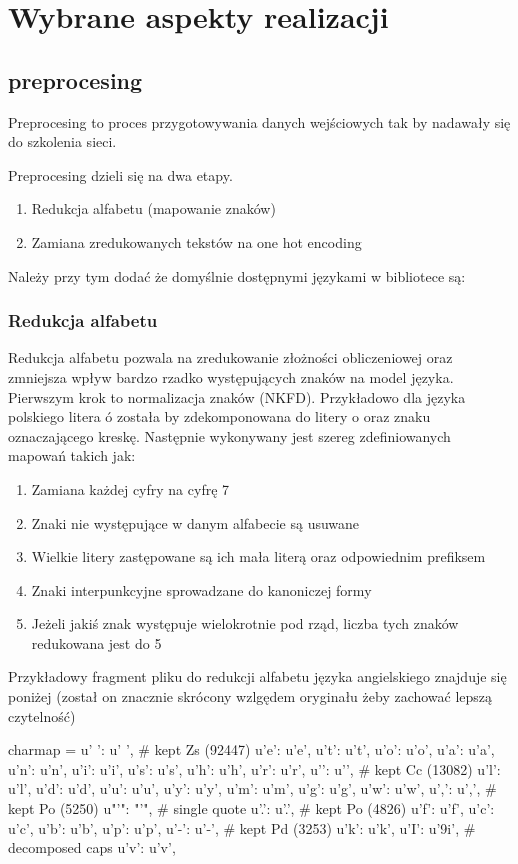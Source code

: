 \newpage
\section{Wybrane aspekty realizacji}

\subsection{preprocesing}
Preprocesing to proces przygotowywania danych wejściowych tak by nadawały się do szkolenia sieci.

Preprocesing dzieli się na dwa etapy.
\begin{enumerate}
	\item Redukcja alfabetu (mapowanie znaków)
	\item Zamiana zredukowanych tekstów na one hot encoding
\end{enumerate}

Należy przy tym dodać że domyślnie dostępnymi językami w bibliotece są:
\languages 


\subsubsection{Redukcja alfabetu}
Redukcja alfabetu pozwala na zredukowanie złożności obliczeniowej oraz zmniejsza wpływ bardzo rzadko
występujących znaków na model języka. Pierwszym krok to normalizacja znaków (NKFD). Przykładowo dla
języka polskiego litera ó została by zdekomponowana do litery o oraz znaku oznaczającego kreskę.
Następnie wykonywany jest szereg zdefiniowanych mapowań takich jak:
\begin{enumerate}
  \item Zamiana każdej cyfry na cyfrę 7
  \item Znaki nie występujące w danym alfabecie są usuwane
  \item Wielkie litery zastępowane są ich mała literą oraz odpowiednim prefiksem
  \item Znaki interpunkcyjne sprowadzane do kanoniczej formy
  \item Jeżeli jakiś znak występuje wielokrotnie pod rząd, liczba tych znaków redukowana jest do 5
\end{enumerate}
Przykładowy fragment pliku do redukcji alfabetu języka
angielskiego znajduje się poniżej (został on znacznie skrócony wzlgędem oryginału żeby zachować lepszą
czytelność)

\begin{python}
charmap = {
    u' ': u' ',                 # kept Zs (92447)
    u'e': u'e',
    u't': u't',
    u'o': u'o',
    u'a': u'a',
    u'n': u'n',
    u'i': u'i',
    u's': u's',
    u'h': u'h',
    u'r': u'r',
    u'\n': u'\n',               # kept Cc (13082)
    u'l': u'l',
    u'd': u'd',
    u'u': u'u',
    u'y': u'y',
    u'm': u'm',
    u'g': u'g',
    u'w': u'w',
    u',': u',',                 # kept Po (5250)
    u"'": "'",                  # single quote
    u'.': u'.',                 # kept Po (4826)
    u'f': u'f',
    u'c': u'c',
    u'b': u'b',
    u'p': u'p',
    u'-': u'-',                 # kept Pd (3253)
    u'k': u'k',
    u'I': u'\xb9i',             # decomposed caps
    u'v': u'v',
}
\end{python}


